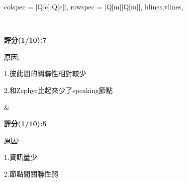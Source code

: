 \begin{longtblr}[
    caption = {臺南大學AI機器人場域驗證影片和艾倫圖靈的故事文本內容及知識圖},
]{
    colspec = {|Q[c]|Q[c]|},
    rowspec = {|Q[m]|Q[m]|},
    hlines,vlines,
}
\begin{minipage}[t][5cm][b]{0.4\textwidth}
            \setcounter{figure}{5} 
            \captionsetup{font=scriptsize}
        \end{minipage} \\
\begin{minipage}[t]{0.4\textwidth}
            \centering
            \small \textbf{評分(1/10):7} \\
            \raggedright
            \small 原因: \par 1.彼此間的關聯性相對較少 \par
                             2.和Zephyr比起來少了speaking節點
            \vspace{5pt}
\end{minipage}  &  
\begin{minipage}[t]{0.4\textwidth}
            \centering
            \small \textbf{評分(1/10):5} \\
            \raggedright
            \small 原因: \par 1.資訊量少\par 2.節點間關聯性弱
\end{minipage} \\
\end{longtblr}

